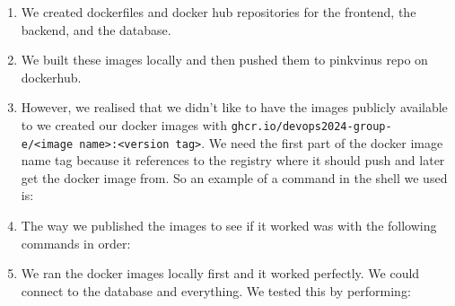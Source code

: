 \begin{enumerate}
    \item We created dockerfiles and docker hub repositories for the frontend, the backend, and the database.
    \item We built these images locally and then pushed them to pinkvinus repo on dockerhub.
    \item However, we realised that we didn't like to have the images publicly available to we created our docker images with \texttt{ghcr.io/devops2024-group-e/\textless{}image\ name\textgreater{}:\textless{}version\ tag\textgreater{}}. We need the first part of the docker image name tag because it references to the registry where it should push and later get the docker image from. So an example of a command in the shell we used is:

    \begin{Shaded}
    \begin{Highlighting}[]
    \end{Highlighting}
    \end{Shaded}
    \item The way we published the images to see if it worked was with the following commands in order:



    \item We ran the docker images locally first and it worked perfectly. We could connect to the database and everything. We tested this by performing:


\end{enumerate}
